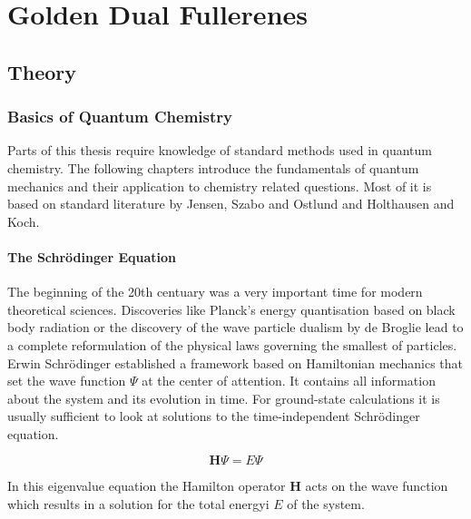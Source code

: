 
\part{Golden Dual Fullerenes}
\label{sec:goldendualfullerenes}


\chapter{Theory}
\label{sec:theorygold}

\section{Basics of Quantum Chemistry}
\label{sec:basicsofQC}

Parts of this thesis require knowledge of standard methods used in quantum
chemistry. The following chapters introduce the fundamentals of quantum
mechanics and their application to chemistry related questions. Most of it is
based on standard literature by Jensen\autocite{JensenIntroductionComputationalChemistry2006},
Szabo and Ostlund\autocite{SzaboModernQuantumChemistry1996} and Holthausen and
Koch\autocite{KochChemistGuideDensity2001}.

\subsection{The Schr\"odinger Equation}
\label{sec:schrodingerequation}

The beginning of the 20th centuary was a very important time for modern
theoretical sciences. Discoveries like Planck's energy quantisation based on
black body radiation or the discovery of the wave particle dualism by de
Broglie lead to a complete reformulation of the physical laws governing the
smallest of particles. Erwin Schr\"odinger established a framework based on
Hamiltonian mechanics that set the wave function $\Psi$ at the center of
attention. It contains all information about the system and its evolution in
time. For ground-state calculations it is usually sufficient to look at
solutions to the time-independent Schr\"odinger equation.

\begin{equation}
	\mathbf{H}\Psi=E\Psi\label{eqn:SchrodingerEquation}
\end{equation}

In this eigenvalue equation the Hamilton operator $\mathbf{H}$ acts on the wave
function which results in a solution for the total energyi $E$ of the system. 

